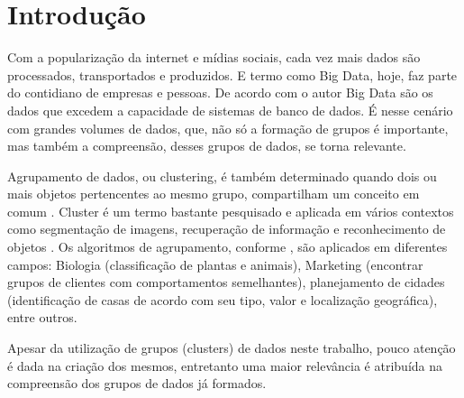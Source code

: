 
\chapter*[Introdução]{Introdução}
Com a popularização da internet e mídias sociais, cada vez mais dados são processados, transportados e produzidos. E termo como Big Data, hoje, faz parte do contidiano de empresas e pessoas. De acordo com o autor  Big Data são os dados que excedem a capacidade de sistemas de banco de dados. É nesse cenário com grandes volumes de dados, que, não só a formação de grupos é importante, mas também a compreensão, desses grupos de dados, se torna relevante.

Agrupamento de dados, ou clustering, é também determinado quando dois ou mais objetos pertencentes ao mesmo grupo, compartilham um conceito em comum \cite{Kumar2013}. Cluster é um termo bastante pesquisado e aplicada em vários contextos como segmentação de imagens, recuperação de informação e reconhecimento de objetos . Os algoritmos de agrupamento, conforme , são aplicados em diferentes campos: Biologia (classificação de plantas e animais), Marketing (encontrar grupos de clientes com comportamentos semelhantes), planejamento de cidades (identificação de casas de acordo com seu tipo, valor e localização geográfica), entre outros.

Apesar da utilização de grupos (clusters) de dados neste trabalho, pouco atenção é dada na criação dos mesmos, entretanto uma maior relevância é atribuída na compreensão dos grupos de dados já formados. 

